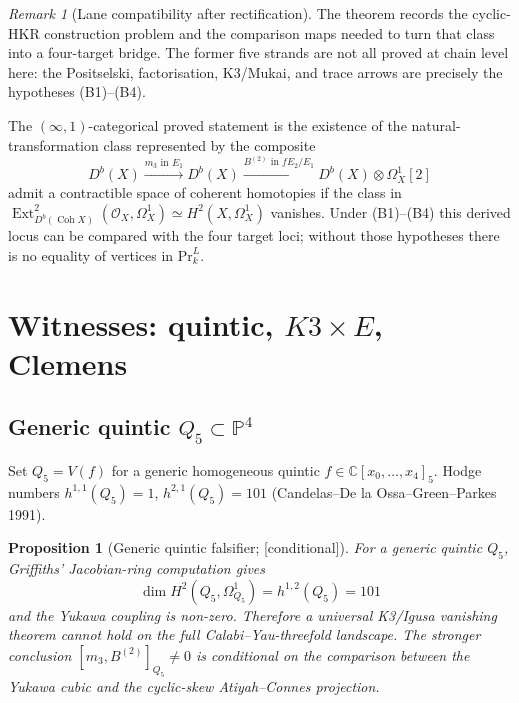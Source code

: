 \documentclass[11pt,reqno]{amsart}
\theoremstyle{plain}
\newtheorem{proposition}[theorem]{Proposition}
\theoremstyle{definition}
\theoremstyle{remark}
\newtheorem{remark}[theorem]{Remark}
\providecommand{\ClaimStatusConditional}{\textnormal{[conditional]}}
\DeclareMathOperator{\Ext}{Ext}
\DeclareMathOperator{\Coh}{Coh}
\newcommand{\Cbb}{\mathbb{C}}
\newcommand{\Pbb}{\mathbb{P}}
\newcommand{\cO}{\mathcal{O}}
\begin{document}
\begin{remark}[Lane compatibility after rectification]
\label{rem:lane-compat}
The theorem records the cyclic-HKR construction problem and the
comparison maps needed to turn that class into a four-target bridge.
The former five strands are not all proved at chain level here: the
Positselski, factorisation, K3/Mukai, and trace arrows are precisely
the hypotheses \textup{(B1)--(B4)}.

The $(\infty,1)$-categorical proved statement is the existence of the natural-transformation class represented by the composite
\[
D^b(X) \xrightarrow{m_3 \text{ in } E_1} D^b(X) \xrightarrow{B^{(2)} \text{ in } fE_2/E_1} D^b(X) \otimes \Omega^1_X[2]
\]
admit a contractible space of coherent homotopies if the class in $\Ext^2_{D^b(\Coh X)}(\cO_X, \Omega^1_X) \simeq H^2(X, \Omega^1_X)$ vanishes. Under \textup{(B1)--(B4)} this derived locus can be compared with the four target loci; without those hypotheses there is no equality of vertices in $\mathrm{Pr}^L_k$.
\end{remark}

\section{Witnesses: quintic, $K3 \times E$, Clemens}
\label{sec:clemens}

\subsection{Generic quintic $Q_5 \subset \Pbb^4$}
Set $Q_5 = V(f)$ for a generic homogeneous quintic $f \in \Cbb[x_0, \ldots, x_4]_5$. Hodge numbers $h^{1,1}(Q_5) = 1$, $h^{2,1}(Q_5) = 101$ (Candelas--De la Ossa--Green--Parkes 1991).

\begin{proposition}[Generic quintic falsifier; \ClaimStatusConditional]
\label{prop:quintic-nonvanish}
For a generic quintic $Q_5$, Griffiths' Jacobian-ring computation gives
\[
  \dim H^2(Q_5,\Omega^1_{Q_5})=h^{1,2}(Q_5)=101
\]
and the Yukawa coupling is non-zero. Therefore a universal K3/Igusa
vanishing theorem cannot hold on the full Calabi--Yau-threefold
landscape. The stronger conclusion
$[m_3,B^{(2)}]_{Q_5}\neq 0$ is conditional on the comparison between
the Yukawa cubic and the cyclic-skew Atiyah--Connes projection.
\end{proposition}
\end{document}
